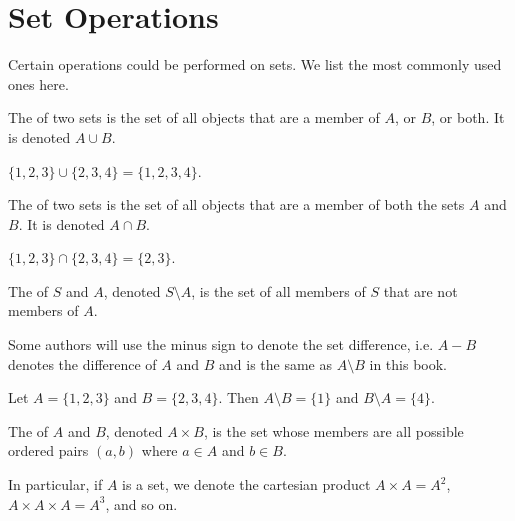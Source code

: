 \section{Set Operations}
Certain operations could be performed on sets. We list the most commonly used ones here.
\begin{definition}
    The  of two sets is the set of all objects that are a member of $A$, or $B$, or both. It is denoted $A \cup B$.
\end{definition}

\begin{example}
    $\{1, 2, 3\} \cup \{2, 3, 4\} = \{1, 2, 3, 4\}$.
\end{example}

\begin{definition}
    The  of two sets is the set of all objects that are a member of both the sets $A$ and $B$. It is denoted $A \cap B$.
\end{definition}

\begin{example}
    $\{1, 2, 3\} \cap \{2, 3, 4\} = \{2, 3\}$.
\end{example}

\begin{definition}
    The  of $S$ and $A$, denoted $S \setminus A$, is the set of all members of $S$ that are not members of $A$.
\end{definition}
\begin{remark}
    Some authors will use the minus sign to denote the set difference, i.e. $A - B$ denotes the difference of $A$ and $B$ and is the same as $A \setminus B$ in this book.
\end{remark}

\begin{example}
    Let $A = \{1, 2, 3\}$ and $B = \{2, 3, 4\}$. Then $A \setminus B = \{1\}$ and $B \setminus A = \{4\}$.
\end{example}

\begin{definition}
    The  of $A$ and $B$, denoted $A \times B$, is the set whose members are all possible ordered pairs $(a, b)$ where $a \in A$ and $b \in B$.
\end{definition}
\begin{remark}
    In particular, if $A$ is a set, we denote the cartesian product $A \times A = A^2$, $A\times A \times A = A^3$, and so on.
\end{remark}

